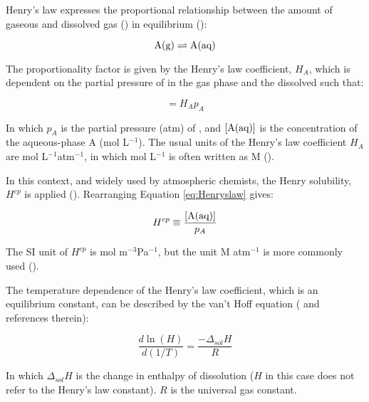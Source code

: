 \medskip

Henry's law expresses the proportional relationship between the amount of gaseous and dissolved gas () in equilibrium (\cite{SeinfeldSpyros}): 

\begin{equation*}
    \mathrm{A(g)} \rightleftharpoons \mathrm{A(aq)}
\end{equation*}

The proportionality factor is given by the Henry's law coefficient, $H_A$, which is dependent on the partial pressure of  in the gas phase and the dissolved  such that: 

\begin{equation}
    [\chem{A(aq)}] = H_Ap_A
    \label{eq:Henryslaw}
\end{equation}

In which $p_A$ is the partial pressure (atm) of , and $[\mathrm{A(aq)}]$ is the concentration of the aqueous-phase A (mol L$^{-1}$). The usual units of the Henry's law coefficient $H_A$ are mol L$^{-1}$atm$^{-1}$, in which mol L$^{-1}$ is often written as M (\cite{SeinfeldSpyros}).

\medskip

In this context, and widely used by atmospheric chemists, the Henry solubility, $H^{cp}$ is applied (\cite{Sander2015}). Rearranging Equation \ref{eq:Henryslaw} gives: 

\begin{equation}
    H^{cp} \equiv \frac{[\mathrm{A(aq)}]}{p_A}
    \label{eq:HenrySol}
\end{equation}

The SI unit of $H^{cp}$ is mol m$^{-3}$Pa$^{-1}$, but the unit M atm$^{-1}$ is more commonly used (\cite{Sander2015}).

\medskip

The temperature dependence of the Henry's law coefficient, which is an equilibrium constant, can be described by the van't Hoff equation (\cite{Sander2015} and references therein): 

\begin{equation*}
    \frac{d\ln(H)}{d(1/T)} = \frac{-\Delta_{sol}H}{R}
    \label{eq:vantHoff}
\end{equation*}

In which $\Delta_{sol}H$ is the change in enthalpy of dissolution ($H$ in this case does not refer to the Henry's law constant). $R$ is the universal gas constant. 

\medskip

